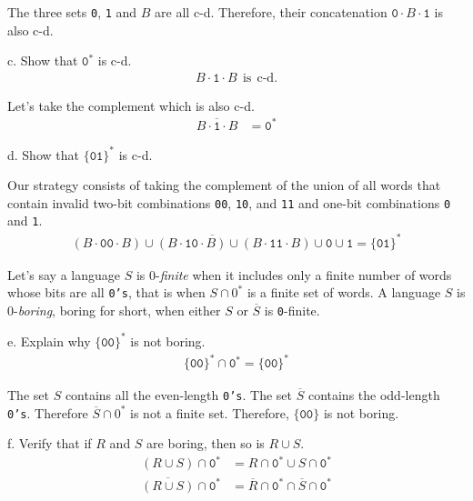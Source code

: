 \documentclass[12pt]{article}
\begin{document}
\par{The three sets \texttt{0}, \texttt{1} and $B$ are all c-d. Therefore, their concatenation $\texttt{0} \cdot B \cdot \texttt{1}$ is also c-d.} 
\newline
\par{c. Show that $\texttt{0}^*$ is c-d.}
\begin{align*}
B \cdot \texttt{1} \cdot B\:\:\text{is}\:\:\text{c-d}.
\end{align*}
\par{Let's take the complement which is also c-d.}
\begin{align*}
\overline{B \cdot \texttt{1} \cdot B} &= \texttt{0}^*
\end{align*}
\par{d. Show that $\{\texttt{01}\}^*$ is c-d.}
\par{Our strategy consists of taking the complement of the union of all words that contain invalid two-bit combinations \texttt{00}, \texttt{10}, and \texttt{11} and one-bit combinations \texttt{0} and \texttt{1}.}
\begin{align*}
\overline{(B \cdot \texttt{00} \cdot B) \cup (B \cdot \texttt{10} \cdot B) \cup (B \cdot \texttt{11} \cdot B) \cup \texttt{0} \cup \texttt{1}} = \{\texttt{01}\}^*
\end{align*}
\par{Let's say a language $S$ is 0-\emph{finite} when it includes only a finite number of words whose bits are all \texttt{0's}, that is when $S \cap 0^*$ is a finite set of words. A language $S$ is 0-\emph{boring}, boring for short, when either $S$ or $\overline{S}$ is \texttt{0}-finite.}
\newline
\par{e. Explain why $\{\texttt{00}\}^*$ is not boring.}
\begin{align*}
\{\texttt{00}\}^* \cap \texttt{0}^* = \{\texttt{00}\}^*
\end{align*}
\par{The set $S$ contains all the even-length \texttt{0's}. The set $\overline{S}$ contains the odd-length \texttt{0's}. Therefore $\overline{S} \cap 0^*$ is not a finite set. Therefore, $\{\texttt{00}\}$ is not boring.}
\newline
\par{f. Verify that if $R$ and $S$ are boring, then so is $R \cup S$.}
\begin{align}
(R \cup S) \cap \texttt{0}^* &= R \cap \texttt{0}^* \cup S \cap \texttt{0}^* \\
\overline{(R \cup S)} \cap \texttt{0}^* &= \overline{R} \cap \texttt{0}^* \cap \overline{S} \cap \texttt{0}^*
\end{align}
\end{document}

